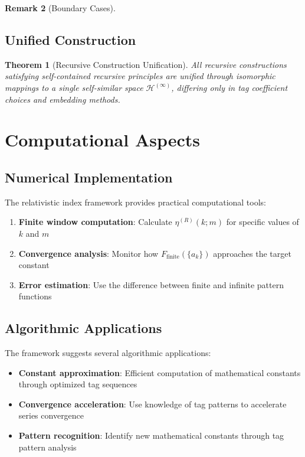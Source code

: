 \documentclass[12pt]{article}
\theoremstyle{plain}
\newtheorem{theorem}{Theorem}[section]
\theoremstyle{definition}
\newtheorem{remark}[theorem]{Remark}
\begin{document}
\begin{remark}[Boundary Cases]
\subsection{Unified Construction}

\begin{theorem}[Recursive Construction Unification]
All recursive constructions satisfying self-contained recursive principles are unified through isomorphic mappings to a single self-similar space $\mathcal{H}^{(\infty)}$, differing only in tag coefficient choices and embedding methods.
\end{theorem}

\section{Computational Aspects}

\subsection{Numerical Implementation}

The relativistic index framework provides practical computational tools:

\begin{enumerate}
\item \textbf{Finite window computation}: Calculate $\eta^{(R)}(k; m)$ for specific values of $k$ and $m$
\item \textbf{Convergence analysis}: Monitor how $F_{\text{finite}}(\{a_k\})$ approaches the target constant
\item \textbf{Error estimation}: Use the difference between finite and infinite pattern functions
\end{enumerate}

\subsection{Algorithmic Applications}

The framework suggests several algorithmic applications:

\begin{itemize}
\item \textbf{Constant approximation}: Efficient computation of mathematical constants through optimized tag sequences
\item \textbf{Convergence acceleration}: Use knowledge of tag patterns to accelerate series convergence
\item \textbf{Pattern recognition}: Identify new mathematical constants through tag pattern analysis
\end{itemize}


\end{remark}
\end{document}
